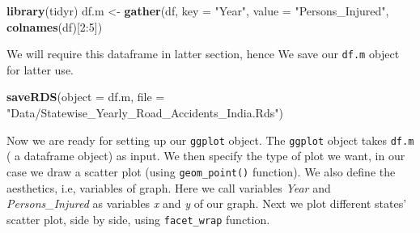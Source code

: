 \documentclass[]{article}
\newenvironment{Shaded}{}{}
\newcommand{\DataTypeTok}[1]{\textcolor[rgb]{0.56,0.13,0.00}{#1}}
\newcommand{\DecValTok}[1]{\textcolor[rgb]{0.25,0.63,0.44}{#1}}
\newcommand{\KeywordTok}[1]{\textcolor[rgb]{0.00,0.44,0.13}{\textbf{#1}}}
\newcommand{\NormalTok}[1]{#1}
\newcommand{\OperatorTok}[1]{\textcolor[rgb]{0.40,0.40,0.40}{#1}}
\newcommand{\StringTok}[1]{\textcolor[rgb]{0.25,0.44,0.63}{#1}}
\begin{document}
\begin{Shaded}
\begin{Highlighting}[]
\KeywordTok{library}\NormalTok{(tidyr)}
\NormalTok{df.m <-}\StringTok{ }\KeywordTok{gather}\NormalTok{(df, }\DataTypeTok{key =} \StringTok{"Year"}\NormalTok{, }\DataTypeTok{value =} \StringTok{"Persons_Injured"}\NormalTok{, }\KeywordTok{colnames}\NormalTok{(df)[}\DecValTok{2}\OperatorTok{:}\DecValTok{5}\NormalTok{])}
\end{Highlighting}
\end{Shaded}

We will require this dataframe in latter section, hence We save our
\texttt{df.m} object for latter use.

\begin{Shaded}
\begin{Highlighting}[]
\KeywordTok{saveRDS}\NormalTok{(}\DataTypeTok{object =}\NormalTok{ df.m, }\DataTypeTok{file =} \StringTok{"Data/Statewise_Yearly_Road_Accidents_India.Rds"}\NormalTok{)}
\end{Highlighting}
\end{Shaded}

Now we are ready for setting up our \texttt{ggplot} object. The
\texttt{ggplot} object takes \texttt{df.m} ( a dataframe object) as
input. We then specify the type of plot we want, in our case we draw a
scatter plot (using \texttt{geom\_point()} function). We also define the
aesthetics, i.e, variables of graph. Here we call variables \emph{Year}
and \emph{Persons\_Injured} as variables \emph{x} and \emph{y} of our
graph. Next we plot different states' scatter plot, side by side, using
\texttt{facet\_wrap} function.

\begin{Shaded}
\end{Shaded}
\end{document}
